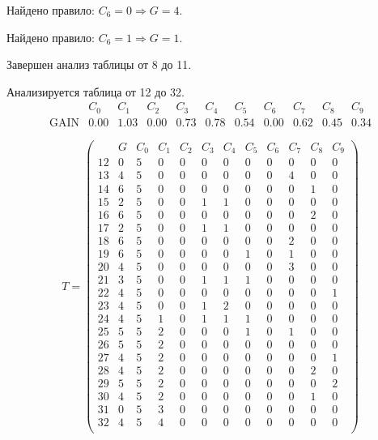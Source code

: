 Найдено правило: $C_{6} = 0 \Longrightarrow G = 4$.

Найдено правило: $C_{6} = 1 \Longrightarrow G = 1$.

Завершен анализ таблицы от 8 до 11.

Анализируется таблица от 12 до 32.
$$ 
\begin{array}{lc|c|cccccccc}
	  & C_{0} & C_{1} & C_{2} & C_{3} & C_{4} & C_{5} & C_{6} & C_{7} & C_{8} & C_{9}\\
 \textrm{GAIN} & 0.00 & 1.03 & 0.00 & 0.73 & 0.78 & 0.54 & 0.00 & 0.62 & 0.45 & 0.34
\end{array}
 $$
 
$$
T = \left( \begin{array}{lcc|c|cccccccc}
	 & G & C_{0} & C_{1} & C_{2} & C_{3} & C_{4} & C_{5} & C_{6} & C_{7} & C_{8} & C_{9}\\
	12 & 0 & 5 & 0 & 0 & 0 & 0 & 0 & 0 & 0 & 0 & 0\\
	13 & 4 & 5 & 0 & 0 & 0 & 0 & 0 & 0 & 4 & 0 & 0\\
	14 & 6 & 5 & 0 & 0 & 0 & 0 & 0 & 0 & 0 & 1 & 0\\
	15 & 2 & 5 & 0 & 0 & 1 & 1 & 0 & 0 & 0 & 0 & 0\\
	16 & 6 & 5 & 0 & 0 & 0 & 0 & 0 & 0 & 0 & 2 & 0\\
	17 & 2 & 5 & 0 & 0 & 1 & 1 & 0 & 0 & 0 & 0 & 0\\
	18 & 6 & 5 & 0 & 0 & 0 & 0 & 0 & 0 & 2 & 0 & 0\\
	19 & 6 & 5 & 0 & 0 & 0 & 0 & 1 & 0 & 1 & 0 & 0\\
	20 & 4 & 5 & 0 & 0 & 0 & 0 & 0 & 0 & 3 & 0 & 0\\
	21 & 3 & 5 & 0 & 0 & 1 & 1 & 1 & 0 & 0 & 0 & 0\\
	22 & 4 & 5 & 0 & 0 & 0 & 0 & 0 & 0 & 0 & 0 & 1\\
	23 & 4 & 5 & 0 & 0 & 1 & 2 & 0 & 0 & 0 & 0 & 0\\
	24 & 4 & 5 & 1 & 0 & 1 & 1 & 1 & 0 & 0 & 0 & 0\\
	25 & 5 & 5 & 2 & 0 & 0 & 0 & 1 & 0 & 1 & 0 & 0\\
	26 & 5 & 5 & 2 & 0 & 0 & 0 & 0 & 0 & 0 & 0 & 0\\
	27 & 4 & 5 & 2 & 0 & 0 & 0 & 0 & 0 & 0 & 0 & 1\\
	28 & 4 & 5 & 2 & 0 & 0 & 0 & 0 & 0 & 0 & 2 & 0\\
	29 & 5 & 5 & 2 & 0 & 0 & 0 & 0 & 0 & 0 & 0 & 2\\
	30 & 4 & 5 & 2 & 0 & 0 & 0 & 0 & 0 & 0 & 1 & 0\\
	31 & 0 & 5 & 3 & 0 & 0 & 0 & 0 & 0 & 0 & 0 & 0\\
	32 & 4 & 5 & 4 & 0 & 0 & 0 & 0 & 0 & 0 & 0 & 0\\
\end{array} \right)
$$

